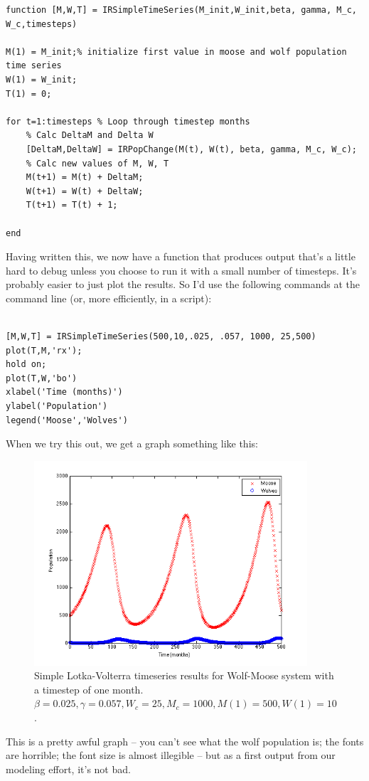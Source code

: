 \begin{verbatim}
function [M,W,T] = IRSimpleTimeSeries(M_init,W_init,beta, gamma, M_c, W_c,timesteps)

M(1) = M_init;% initialize first value in moose and wolf population time series
W(1) = W_init;
T(1) = 0;

for t=1:timesteps % Loop through timestep months
    % Calc DeltaM and Delta W
    [DeltaM,DeltaW] = IRPopChange(M(t), W(t), beta, gamma, M_c, W_c); 
    % Calc new values of M, W, T
    M(t+1) = M(t) + DeltaM; 
    W(t+1) = W(t) + DeltaW;
    T(t+1) = T(t) + 1;
        
end
\end{verbatim}

Having written this, we now have a function that produces output that's a little hard to debug unless you choose to run it with a small number of timesteps.  It's probably easier to just plot the results.  So I'd use the following commands at the command line (or, more efficiently, in a script):
\begin{verbatim}

[M,W,T] = IRSimpleTimeSeries(500,10,.025, .057, 1000, 25,500)
plot(T,M,'rx');
hold on;
plot(T,W,'bo')
xlabel('Time (months)')
ylabel('Population')
legend('Moose','Wolves')
\end{verbatim}

When we try this out, we get a graph something like this:
\begin{figure}[h!]
\includegraphics[width=4in]{figs/WolfMooseTImeSeries}
\caption{Simple Lotka-Volterra timeseries results for Wolf-Moose system with a timestep of one month.  $\beta = 0.025, \gamma = 0.057, W_c = 25, M_c=1000, M(1) = 500, W(1) = 10$.}
\end{figure}

This is a pretty awful graph -- you can't see what the wolf population is; the fonts are horrible; the font size is almost illegible -- but as a first output from our modeling effort, it's not bad.  

